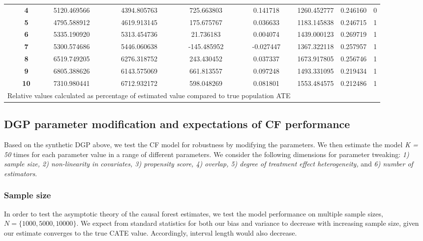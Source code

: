 \documentclass[12pt]{article}
\begin{document}
\begin{table}
{\begin{tabular}{lc|ccccccc}
\addlinespace
&\textbf{4} &5120.469566 & 4394.805763 & 725.663803 & 0.141718 & 1260.452777 & 0.246160 & 0 \\
\addlinespace
&\textbf{5} & 4795.588912 & 4619.913145 & 175.675767 & 0.036633 & 1183.145838 & 0.246715 & 1 \\
\addlinespace
&\textbf{6} & 5335.190920 & 5313.454736 & 21.736183 & 0.004074 & 1439.000123 & 0.269719 & 1 \\
\addlinespace
&\textbf{7} & 5300.574686 & 5446.060638 & -145.485952 & -0.027447 & 1367.322118 & 0.257957 & 1 \\\addlinespace
&\textbf{8} &6519.749205 & 6276.318752 & 243.430452 & 0.037337 & 1673.917805 & 0.256746 & 1 \\\addlinespace
&\textbf{9} & 6805.388626 & 6143.575069 & 661.813557 & 0.097248 & 1493.331095 & 0.219434 & 1 \\
\addlinespace
&\textbf{10} & 7310.980441 & 6712.932172 & 598.048269 & 0.081801 & 1553.484575 & 0.212486 & 1\\
\bottomrule
\multicolumn{6}{p{\textwidth}}{\footnotesize Relative values calculated as percentage of estimated value compared to true population ATE}\\
\end{tabular}}
\end{table}




\subsection{DGP parameter modification and expectations of CF performance}

Based on the synthetic DGP above, we test the CF model for robustness by
modifying the parameters. We then estimate the model \textit{K = 50} times for
each parameter value in a range of different parameters. We consider the
following dimensions for parameter tweaking: \textit{1) sample size, 2)
non-linearity in covariates, 3) propensity score, 4) overlap, 5) degree of
treatment effect heterogeneity,} and \textit{6) number of estimators}. 

\subsubsection{Sample size} 
In order to test the asymptotic theory of the causal forest estimates, we test
the model performance on multiple sample sizes, $ N = \{1000, 5000, 10000\}$. We
expect from standard statistics for both our bias and variance to decrease with
increasing sample size, given our estimate converges to the true CATE value.
Accordingly, interval length would also decrease.
\end{document}
